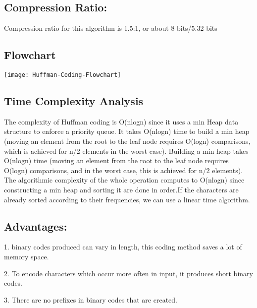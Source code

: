 \documentclass[a4paper, 12pt]{article}
\begin{document}
\subsection{Compression Ratio:}
\par Compression ratio for this algorithm is 1.5:1, or about 8 bits/5.32 bits\\

\subsection{Flowchart}

\texttt{[image: Huffman-Coding-Flowchart]}

\vspace{5mm}
\subsection{Time Complexity Analysis}
\par The complexity of Huffman coding is O(nlogn) since it uses a min Heap data structure 
to enforce a priority queue.
It takes O(nlogn) time to build a min heap (moving an element from the root to 
the leaf node requires O(logn) comparisons, which is achieved for n/2 elements in the 
worst case).
Building a min heap takes O(nlogn) time (moving an element from the root to 
the leaf node requires O(logn) comparisons, and in the worst case, this is achieved for 
n/2 elements).
The algorithmic complexity of the whole operation computes to O(nlogn) since 
constructing a min heap and sorting it are done in order.If the characters are already 
sorted according to their frequencies, we can use a linear time algorithm.
\\

\subsection{ Advantages:}
\par 1. binary codes produced can vary in length, this coding method saves a lot of memory space.
\par 2. To encode characters which occur more often in input, it produces short binary codes.
\par 3. There are no prefixes in binary codes that are created.
\\
\end{document}
